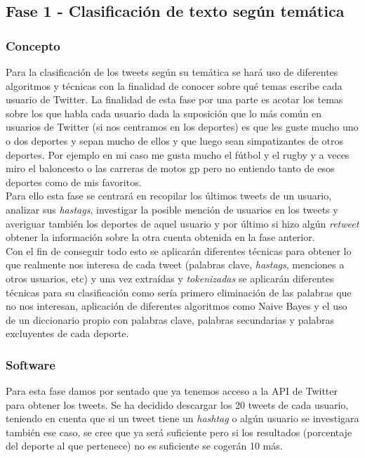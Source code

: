 \documentclass[../all.tex]{subfiles}
\begin{document}
\newpage    
\subsection{Fase 1 - Clasificación de texto según temática}
    \subsubsection{Concepto}
    	Para la clasificación de los tweets según su temática se hará uso de diferentes algoritmos y técnicas con la finalidad de conocer sobre qué temas escribe cada usuario de Twitter. La finalidad de esta fase por una parte es acotar los temas sobre los que habla cada usuario dada la suposición que lo más común en usuarios de Twitter (si nos centramos en los deportes) es que les guste mucho uno o dos deportes y sepan mucho de ellos y que luego sean simpatizantes de otros deportes. Por ejemplo en mi caso me gusta mucho el fútbol y el rugby y a veces miro el baloncesto o las carreras de motos gp pero no entiendo tanto de esos deportes como de mis favoritos. \\
    	
    	Para ello esta fase se centrará en recopilar los últimos tweets de un usuario, analizar sus \textit{hastags}, investigar la posible mención de usuarios en los tweets y averiguar también los deportes de aquel usuario y por último  si hizo algún \textit{retweet}  obtener la información sobre la otra cuenta obtenida en la fase anterior.\\
    	
    	Con el fin de conseguir todo esto se aplicarán diferentes técnicas para obtener lo que realmente nos interesa de cada tweet (palabras clave, \textit{hastags}, menciones a otros usuarios, etc) y una vez extraídas y \textit{tokenizadas} se aplicarán diferentes técnicas para su clasificación como sería primero eliminación de las palabras que no nos interesan, aplicación de diferentes algoritmos como Naive Bayes y el uso de un diccionario propio con palabras clave, palabras secundarias y palabras excluyentes de cada deporte.
    	
    \newpage
    \subsubsection{Software}
    	Para esta fase damos por sentado que ya tenemos acceso a la API de Twitter para obtener los tweets. Se ha decidido descargar los 20 tweets de cada usuario, teniendo en cuenta que si un tweet tiene un \textit{hashtag} o algún usuario se investigara también ese caso, se cree que ya será suficiente pero si los resultados (porcentaje del deporte al que pertenece) no es suficiente se cogerán 10 más.\\
    	
\end{document}
